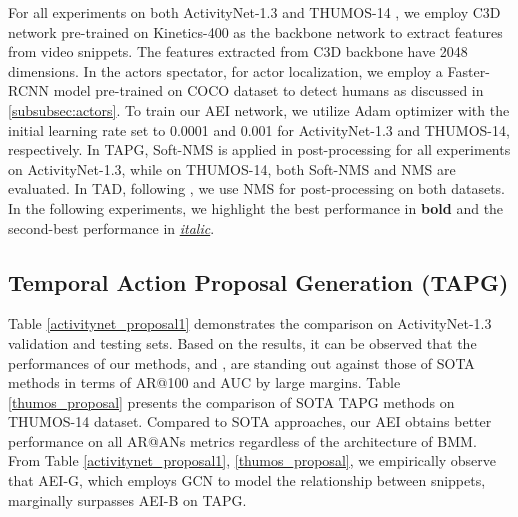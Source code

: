 \documentclass{bmvc2k}
\begin{document}
\noindent
For all experiments on both ActivityNet-1.3 \cite{caba2015activitynet} and THUMOS-14 \cite{THUMOS14}, we employ C3D \cite{C3D} network pre-trained on Kinetics-400 \cite{Kinetics} as the backbone network to extract features from video snippets. The features extracted from C3D backbone have 2048 dimensions.
\newline \indent
In the actors spectator, for actor localization, we employ a Faster-RCNN model \cite{FasterRCNN} pre-trained on COCO \cite{cocodataset} dataset to detect humans as discussed in \ref{subsubsec:actors}. To train our AEI network, we utilize Adam optimizer with the initial learning rate set to 0.0001 and 0.001 for ActivityNet-1.3 and THUMOS-14, respectively. 
\newline \indent
In TAPG, Soft-NMS \cite{SoftNMS} is applied in post-processing for all experiments on ActivityNet-1.3, while on THUMOS-14, both Soft-NMS \cite{SoftNMS} and NMS \cite{NMS} are evaluated. In TAD, following \cite{lin2018bsn, bmn}, we use NMS \cite{NMS} for post-processing on both datasets.
\newline \indent
In the following experiments, we highlight the best performance in \textbf{bold} and the second-best performance in \underline{\textit{italic}}.

\subsection{Temporal Action Proposal Generation (TAPG)}

Table \ref{activitynet_proposal1} demonstrates the comparison on ActivityNet-1.3 validation and testing sets. Based on the results, it can be observed that the performances of our methods,  and , are standing out against those of SOTA methods in terms of AR@100 and AUC by large margins. Table \ref{thumos_proposal} presents the comparison of SOTA TAPG methods on THUMOS-14 dataset. Compared to SOTA approaches, our AEI obtains better performance on all AR@ANs metrics regardless of the architecture of BMM. From Table \ref{activitynet_proposal1}, \ref{thumos_proposal}, we empirically observe that AEI-G, which employs GCN to model the relationship between snippets, marginally surpasses  AEI-B on TAPG.
\end{document}
